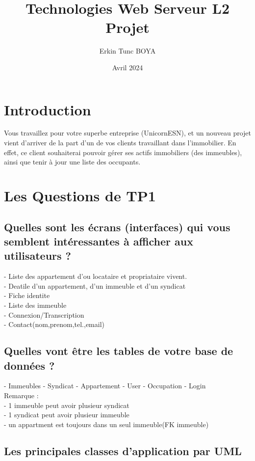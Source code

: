 \documentclass{article}
\title{Technologies Web Serveur \- L2 \\ Projet}
\author{Erkin Tunc BOYA}
\date{Avril 2024}
\begin{document}
\maketitle

\section{Introduction}
Vous travaillez pour votre superbe entreprise (UnicornESN), et un nouveau projet vient d'arriver de la part d'un de vos clients travaillant dans l'immobilier. En effet, ce client souhaiterai pouvoir gérer ses actifs immobiliers (des immeubles), ainsi que tenir à jour une liste des occupants.

\section{Les Questions de TP1}

\subsection{Quelles sont les écrans (interfaces) qui vous semblent intéressantes à afficher aux utilisateurs ?}
\noindent- Liste des appartement d'ou locataire et propriataire vivent.\\
- Deatile d'un appartement, d'un immeuble et d'un syndicat\\
- Fiche identite\\
- Liste des immeuble\\
- Connexion/Transcription\\
- Contact(nom,prenom,tel.,email)\\

\subsection{Quelles vont être les tables de votre base de données ?}
- Immeubles
- Syndicat
- Appartement
- User
- Occupation 
- Login\\

\noindent Remarque : \\
	\indent - 1 immeuble peut avoir plusieur syndicat \\
	\indent - 1 syndicat peut avoir plusieur immeuble \\
	\indent - un appartment est toujours dans un seul immeuble(FK immeuble)



\subsection{Les principales classes d'application par UML }
\end{document}
